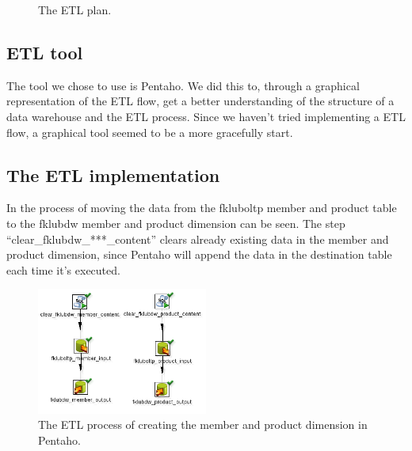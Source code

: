 \begin{figure}[H]
    \caption{The ETL plan.}
    \label{fig:etl-plan}
\end{figure}

\subsection{ETL tool}
The tool we chose to use is Pentaho.
We did this to, through a graphical representation of the ETL flow, get a better understanding of the structure of a data warehouse and the ETL process.
Since we haven't tried implementing a ETL flow, a graphical tool seemed to be a more gracefully start. 

\subsection{The ETL implementation}
In  the process of moving the data from the fkluboltp member and product table to the fklubdw member and product dimension can be seen.
The step ``clear\_fklubdw\_***\_content'' clears already existing data in the member and product dimension, since Pentaho will append the data in the destination table each time it's executed. 

\begin{figure}[H]
    \centering
    \includegraphics[width=0.5\textwidth]{img/product_memb_dim.png}
    \caption{The ETL process of creating the member and product dimension in Pentaho.}
    \label{fig:etl-process1}
\end{figure}

